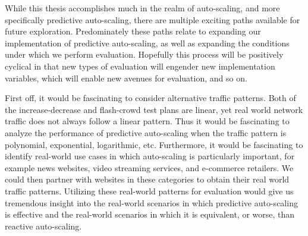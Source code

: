 While this thesis accomplishes much in the realm of auto-scaling, and more
specifically predictive auto-scaling, there are multiple exciting paths
available for future exploration. Predominately these paths relate to expanding
our implementation of predictive auto-scaling, as well as expanding the
conditions under which we perform evaluation. Hopefully this process will be
positively cyclical in that new types of evaluation will engender new
implementation variables, which will enable new avenues for evaluation, and so
on.

First off, it would be fascinating to consider alternative traffic patterns.
Both of the increase-decrease and flash-crowd test plans are linear, yet real
world network traffic does not always follow a linear pattern. Thus it would be
fascinating to analyze the performance of predictive auto-scaling when the
traffic pattern is polynomial, exponential, logarithmic, etc. Furthermore, it
would be fascinating to identify real-world use cases in which auto-scaling is
particularly important, for example news websites, video streaming services, and
e-commerce retailers. We could then partner with websites in these categories to
obtain their real world traffic patterns. Utilizing these real-world patterns
for evaluation
would give us tremendous insight into the real-world scenarios in which
predictive auto-scaling is effective and the real-world scenarios in which it is
equivalent, or worse, than reactive auto-scaling.

